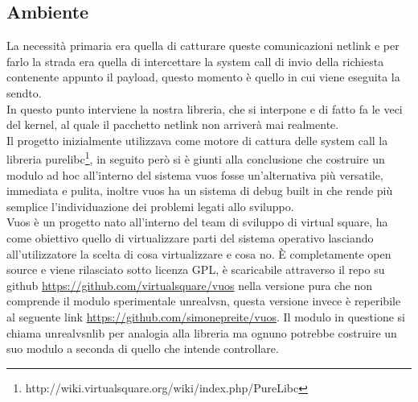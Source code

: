 \subsection{Ambiente}
La necessit\`a primaria era quella di catturare queste comunicazioni netlink e per farlo la strada era quella di intercettare la system call di invio della richiesta contenente appunto il payload, questo momento \`e quello in cui viene eseguita la sendto.\\
In questo punto interviene la nostra libreria, che si interpone e di fatto fa le veci del kernel, al quale il pacchetto netlink non arriver\`a mai realmente.\\
Il progetto inizialmente utilizzava come motore di cattura delle system call la libreria purelibc\footnote{http://wiki.virtualsquare.org/wiki/index.php/PureLibc}, in seguito per\`o si \`e giunti alla conclusione che costruire un modulo ad hoc all'interno del sistema vuos fosse un'alternativa pi\`u versatile, immediata e pulita, inoltre vuos ha un sistema di debug built in che rende pi\`u semplice l'individuazione dei problemi legati allo sviluppo.\\
Vuos \`e un progetto nato all'interno del team di sviluppo di virtual square, ha come obiettivo quello di virtualizzare parti del sistema operativo lasciando all'utilizzatore la scelta di cosa virtualizzare e cosa no. \`E completamente open source e viene rilasciato sotto licenza GPL, \`e scaricabile attraverso il repo su github \url{https://github.com/virtualsquare/vuos} nella versione pura che non comprende il modulo sperimentale unrealvsn, questa versione invece \`e reperibile al seguente link  \url{https://github.com/simonepreite/vuos}.
Il modulo in questione si chiama unrealvsnlib per analogia alla libreria ma ognuno potrebbe costruire un suo modulo a seconda di quello che intende controllare.\\

